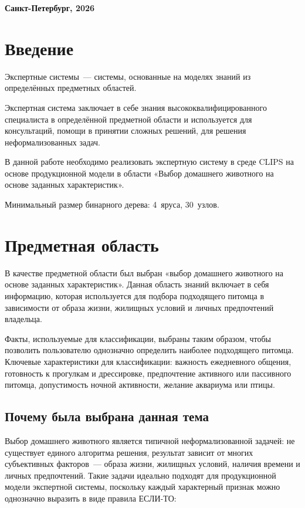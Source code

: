 \documentclass[a4paper,final]{article}
\begin{document}
	\hfill \break
	\hfill \break
	\begin{center} \small\bf{Санкт-Петербург, 2026} \end{center}
	\thispagestyle{empty}

\newpage
\renewcommand{\contentsname}{Содержание}
\tableofcontents


\newpage
\section*{Введение}

Экспертные системы~--- системы, основанные на моделях знаний из определённых предметных областей.

Экспертная система заключает в себе знания высококвалифицированного специалиста в определённой предметной области и используется для консультаций, помощи в принятии сложных решений, для решения неформализованных задач.

В данной работе необходимо реализовать экспертную систему в среде CLIPS на основе продукционной модели в области «Выбор домашнего животного на основе заданных характеристик».

Минимальный размер бинарного дерева: 4~яруса, 30~узлов.


\newpage
\section{Предметная область}

В качестве предметной области был выбран «выбор домашнего животного на основе заданных характеристик». Данная область знаний включает в себя информацию, которая используется для подбора подходящего питомца в зависимости от образа жизни, жилищных условий и личных предпочтений владельца.

Факты, используемые для классификации, выбраны таким образом, чтобы позволить пользователю однозначно определить наиболее подходящего питомца. Ключевые характеристики для классификации: важность ежедневного общения, готовность к прогулкам и дрессировке, предпочтение активного или пассивного питомца, допустимость ночной активности, желание аквариума или птицы.

\subsection*{Почему была выбрана данная тема}

Выбор домашнего животного является типичной неформализованной задачей: не существует единого алгоритма решения, результат зависит от многих субъективных факторов~--- образа жизни, жилищных условий, наличия времени и личных предпочтений. Такие задачи идеально подходят для продукционной модели экспертной системы, поскольку каждый характерный признак можно однозначно выразить в виде правила ЕСЛИ-ТО:
\end{document}
